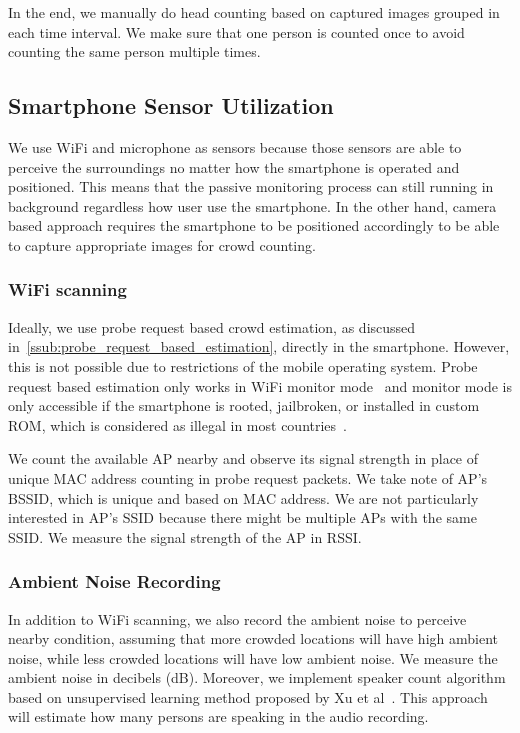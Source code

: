 	In the end, we manually do head counting based on captured images grouped in each time interval. We make sure that one person is counted once to avoid counting the same person multiple times.

\subsection{Smartphone Sensor Utilization} %
\label{sub:smartphone_sensor_utilization}
We use WiFi and microphone as sensors because those sensors are able to perceive the surroundings no matter how the smartphone is operated and positioned. This means that the passive monitoring process can still running in background regardless how user use the smartphone. In the other hand, camera based approach requires the smartphone to be positioned accordingly to be able to capture appropriate images for crowd counting.

	\subsubsection{WiFi scanning} %
	\label{ssub:wifi_scanning}
	Ideally, we use probe request based crowd estimation, as discussed in~\autoref{ssub:probe_request_based_estimation}, directly in the smartphone. However, this is not possible due to restrictions of the mobile operating system. Probe request based estimation only works in WiFi monitor mode~\cite{thesis052,thesis079} and monitor mode is only accessible if the smartphone is rooted, jailbroken, or installed in custom \ac{ROM}, which is considered as illegal in most countries~\cite{rootjailbreak}.
	
	We count the available \ac{AP} nearby and observe its signal strength in place of unique \ac{MAC} address counting in probe request packets. We take note of \ac{AP}'s \ac{BSSID}, which is unique and based on \ac{MAC} address. We are not particularly interested in \ac{AP}'s \ac{SSID} because there might be multiple \ac{AP}s with the same \ac{SSID}. We measure the signal strength of the \ac{AP} in \ac{RSSI}.

	\subsubsection{Ambient Noise Recording} %
	\label{ssub:ambient_noise_recording}
	In addition to WiFi scanning, we also record the ambient noise to perceive nearby condition, assuming that more crowded locations will have high ambient noise, while less crowded locations will have low ambient noise. We measure the ambient noise in decibels (dB). Moreover, we implement speaker count algorithm based on unsupervised learning method proposed by Xu et al~\cite{thesis067}. This approach will estimate how many persons are speaking in the audio recording.

